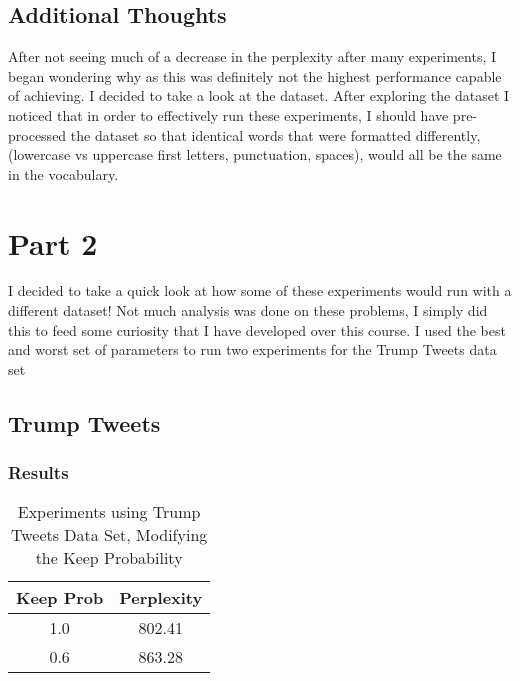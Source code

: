 \documentclass[a4paper]{article}
\begin{document}
\subsection{Additional Thoughts}
After not seeing much of a decrease in the perplexity after many experiments, I began wondering why as this was definitely not the highest performance capable of achieving. I decided to take a look at the dataset. After exploring the dataset I noticed that in order to effectively run these experiments, I should have pre-processed the dataset so that identical words that were formatted differently, (lowercase vs uppercase first letters, punctuation, spaces), would all be the same in the vocabulary.

\section{Part 2}
I decided to take a quick look at how some of these experiments would run with a different dataset! Not much analysis was done on these problems, I simply did this to feed some curiosity that I have developed over this course. I used the best and worst set of parameters to run two experiments for the Trump Tweets data set

\subsection{Trump Tweets}
\subsubsection{Results}
\begin{table}[h]
 \caption{Experiments using Trump Tweets Data Set, Modifying the Keep Probability}
 \label{table}
 \begin{center}
 
  \begin{tabular}{c|c}
    \hline \hline
    Keep Prob & Perplexity \\
    \hline \hline
    1.0 & 802.41 \\
    0.6 & 863.28 \\
    \hline \hline
  \end{tabular}
 \end{center}
\end{table}
\end{document}
